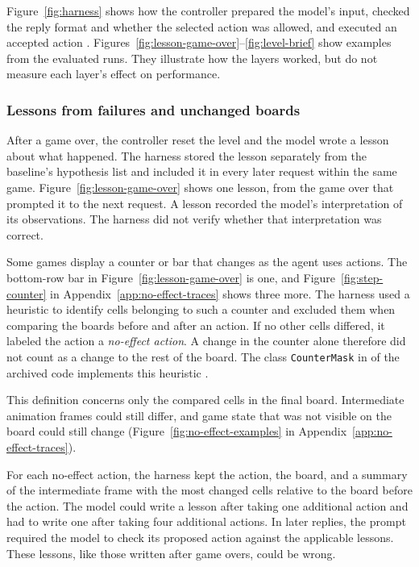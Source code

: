 Figure~\ref{fig:harness} shows how the controller prepared the model's input, checked the reply format and whether the selected action was allowed, and executed an accepted action \citep{dai2026layered}. Figures~\ref{fig:lesson-game-over}--\ref{fig:level-brief} show examples from the evaluated runs. They illustrate how the layers worked, but do not measure each layer's effect on performance.



\subsubsection{Lessons from failures and unchanged boards}
After a game over, the controller reset the level and the model wrote a lesson about what happened. The harness stored the lesson separately from the baseline's hypothesis list and included it in every later request within the same game. Figure~\ref{fig:lesson-game-over} shows one lesson, from the game over that prompted it to the next request. A lesson recorded the model’s interpretation of its observations. The harness did not verify whether that interpretation was correct.



Some games display a counter or bar that changes as the agent uses actions. The bottom-row bar in Figure~\ref{fig:lesson-game-over} is one, and Figure~\ref{fig:step-counter} in Appendix~\ref{app:no-effect-traces} shows three more. The harness used a heuristic to identify cells belonging to such a counter and excluded them when comparing the boards before and after an action. If no other cells differed, it labeled the action a \emph{no-effect action}. A change in the counter alone therefore did not count as a change to the rest of the board. The class \texttt{CounterMask} in  of the archived code implements this heuristic \citep{dai2026harnessexport}.

This definition concerns only the compared cells in the final board. Intermediate animation frames could still differ, and game state that was not visible on the board could still change (Figure~\ref{fig:no-effect-examples} in Appendix~\ref{app:no-effect-traces}).

For each no-effect action, the harness kept the action, the board, and a summary of the intermediate frame with the most changed cells relative to the board before the action. The model could write a lesson after taking one additional action and had to write one after taking four additional actions. In later replies, the prompt required the model to check its proposed action against the applicable lessons. These lessons, like those written after game overs, could be wrong.

